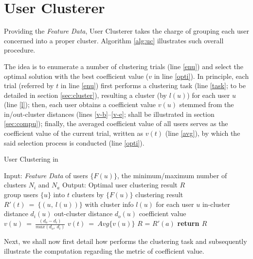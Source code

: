 \section{User Clusterer}
\label{sec:uc}


Providing the \textit{Feature Data}, User Clusterer takes the charge of grouping each user concerned into a proper cluster.
Algorithm \ref{alg:uc} illustrates such overall procedure.

The idea is to enumerate a number of clustering trials (line \ref{enu}) and select the optimal solution with the best coefficient value ($v$ in line \ref{opti}).
In principle, each trial (referred by $t$ in line \ref{enu}) first performs a clustering task (line \ref{task}; to be detailed in section \ref{sec:cluster}), resulting a cluster (by $l(u)$) for each user $u$ (line \ref{l}); 
then, each user obtains a coefficient value $v(u)$ stemmed from the in/out-cluster distances (lines \ref{v-b}--\ref{v-e}; shall be illustrated in section \ref{sec:compu});
finally, the averaged coefficient value of all users serves as the coefficient value of the current trial, written as $v(t)$ (line \ref{avg}), by which the said selection process is conducted (line \ref{opti}).


\begin{algorithm}[t]
\caption{User Clustering in \sys{}}
\label{alg:uc}

\begin{algorithmic}[1]
\State Input: \textit{Feature Data} of users $\{F(u)\}$, the minimum/maximum number of clusters $N_i$ and $N_a$
\State Output: Optimal user clustering result $R$
\\
 \label{enu}
	\State group users $\{u\}$ into $t$ clusters by $\{F(u)\}$ \label{task}
	\State clustering result $R'(t)\ =\ \{(u,\ l(u))\}$ with cluster info $l(u)$ for each user $u$ \label{l}
		\State in-cluster distance $d_i(u)$ \label{v-b}
		\State out-cluster distance $d_o(u)$
		\State coefficient value $v(u)\ =\ \frac{(d_o - d_i)}{max(d_o,\ d_i)}$ \label{v-e}
	\EndFor
	\State $v(t)\ =\ Avg\{v(u)\}$ \label{avg}
\EndFor
{} \label{opti}
	\State $R$ = $R'(a)$
\EndIf
\State \bfseries{return} $R$
\end{algorithmic}
\end{algorithm}

Next, we shall now first detail how \sys{} performs the clustering task and subsequently illustrate the computation regarding the metric of coefficient value.

